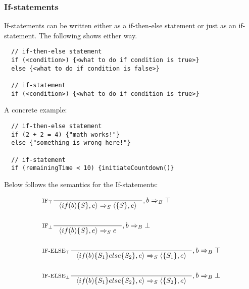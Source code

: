 \subsubsection{If-statements}
\label{subsec:ifStatements}
\newcommand{\Tif}{\text{if}}
\newcommand{\Telse}{\text{else}}

If-statements can be written either as a if-then-else statement or just as an if-statement. The following shows either way.

\begin{verbatim}
  // if-then-else statement
  if (<condition>) {<what to do if condition is true>}
  else {<what to do if condition is false>}

  // if-statement
  if (<condition>) {<what to do if condition is true>}
\end{verbatim}

A concrete example:

\begin{verbatim}
  // if-then-else statement
  if (2 + 2 = 4) {"math works!"}
  else {"something is wrong here!"}

  // if-statement
  if (remainingTime < 10) {initiateCountdown()}
\end{verbatim}

Below follows the semantics for the If-statements:

\begin{align*}
&\inference[$\text{IF}_\top$]{}
                      {\Braket{if(b)\{S\},e} \Rightarrow_S \Braket{\{S\},e}}
                      {,b \Rightarrow_B \top}
\\\\
&\inference[$\text{IF}_\bot$]{}
                      {\Braket{if(b)\{S\},e} \Rightarrow_S e}
                      {,b \Rightarrow_B \bot}
\\\\
&\inference[$\text{IF-ELSE}_\top$]{}
                      {\Braket{if(b)\{S_1\}else\{S_2\},e} \Rightarrow_S \Braket{\{S_1\},e}}
                      {,b \Rightarrow_B \top}
\\\\
&\inference[$\text{IF-ELSE}_\bot$]{}
                      {\Braket{if(b)\{S_1\}else\{S_2\},e} \Rightarrow_S \Braket{\{S_2\},e}}
                      {,b \Rightarrow_B \bot}
\end{align*}